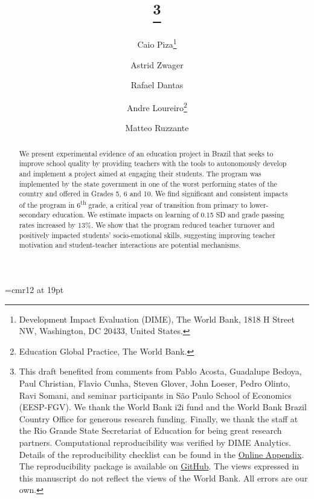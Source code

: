 \documentclass[11pt,a4paper]{article}
\begin{document}
	
	
	\font\myfont=cmr12 at 19pt
	\title{\thanks{This draft benefited from comments from Pablo Acosta, Guadalupe Bedoya, Paul Christian, Flavio Cunha, Steven Glover, John Loeser, Pedro Olinto, Ravi Somani, and seminar participants in São Paulo School of Economics (EESP-FGV). We thank the World Bank i2i fund and the World Bank Brazil Country Office for generous  research  funding. Finally, we thank the staff at the Rio Grande State Secretariat of Education for being great research partners. Computational reproducibility was verified by DIME Analytics. Details of the reproducibility checklist can be found in the \href{https://github.com/worldbank/brazil-pip-education/blob/master/pip_app.pdf}{Online Appendix}. The reproducibility package is available on \href{https://github.com/worldbank/brazil-pip-education}{GitHub}. The views expressed in this manuscript do not reflect the views of the World Bank. All errors are our own.}}
	
	\newcommand*\samethanks[1][\value{footnote}]{\footnotemark[#1]}
	
	\author{%
		Caio Piza\thanks{Development Impact Evaluation (DIME), The World Bank, 1818 H Street NW, Washington, DC 20433, United States.}%
		\and Astrid Zwager\samethanks[2]%
		\and Rafael Dantas\samethanks[2]%
		\and Andre Loureiro\thanks{Education Global Practice, The World Bank.}%
		\and Matteo Ruzzante\samethanks[2]
	}
	
	
	\date{}
	
	\maketitle
	
	\begin{abstract}
		\noindent We present experimental evidence of an education project in Brazil that seeks to improve school quality by providing teachers with the tools to autonomously develop and implement a project aimed at engaging their students. The program was implemented by the state government in one of the worst performing states of the country and offered in Grades 5, 6 and 10. We find significant and consistent impacts of the program in 6\textsuperscript{th} grade, a critical year of transition from primary to lower-secondary education. We estimate impacts on learning of 0.15 SD and grade passing rates increased by 13\%. We show that the program reduced teacher turnover and positively impacted students' socio-emotional skills, suggesting improving teacher motivation and student-teacher interactions are potential mechanisms.   
	\end{abstract}
	
\end{document}
